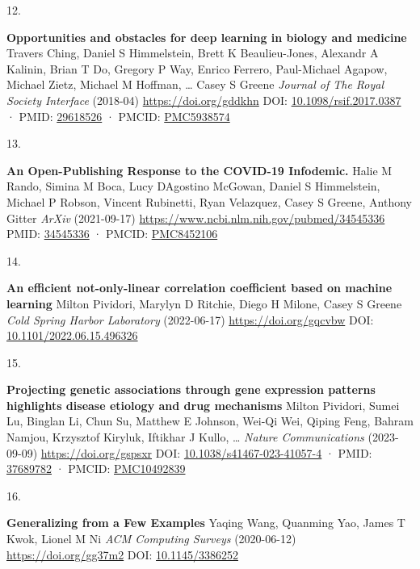 \documentclass[
]{article}
\newlength{\cslhangindent}
\newlength{\csllabelwidth}
\newlength{\cslentryspacingunit} %
\newenvironment{CSLReferences}[2] %
 {%
  \setlength{\parindent}{0pt}
  \ifodd #1
  \let\oldpar\par
  \def\par{\hangindent=\cslhangindent\oldpar}
  \fi
  \setlength{\parskip}{#2\cslentryspacingunit}
 }%
 {}
\newcommand{\CSLBlock}[1]{#1\hfill\break}
\newcommand{\CSLLeftMargin}[1]{\parbox[t]{\csllabelwidth}{#1}}
\newcommand{\CSLRightInline}[1]{\parbox[t]{\linewidth - \csllabelwidth}{#1}\break}
\begin{document}
\begin{CSLReferences}{0}{0}
\leavevmode{}%
\CSLLeftMargin{12. }%
\CSLRightInline{\textbf{Opportunities and obstacles for deep learning in biology and medicine}
\CSLBlock{Travers Ching, Daniel S Himmelstein, Brett K Beaulieu-Jones, Alexandr A Kalinin, Brian T Do, Gregory P Way, Enrico Ferrero, Paul-Michael Agapow, Michael Zietz, Michael M Hoffman, \ldots{} Casey S Greene} \emph{Journal of The Royal Society Interface} (2018-04) \url{https://doi.org/gddkhn}
\CSLBlock{DOI: \href{https://doi.org/10.1098/rsif.2017.0387}{10.1098/rsif.2017.0387} · PMID: \href{https://www.ncbi.nlm.nih.gov/pubmed/29618526}{29618526} · PMCID: \href{https://www.ncbi.nlm.nih.gov/pmc/articles/PMC5938574}{PMC5938574}}}

\leavevmode{}%
\CSLLeftMargin{13. }%
\CSLRightInline{\textbf{An Open-Publishing Response to the COVID-19 Infodemic.}
\CSLBlock{Halie M Rando, Simina M Boca, Lucy D\textquotesingle Agostino McGowan, Daniel S Himmelstein, Michael P Robson, Vincent Rubinetti, Ryan Velazquez, Casey S Greene, Anthony Gitter} \emph{ArXiv} (2021-09-17) \url{https://www.ncbi.nlm.nih.gov/pubmed/34545336}
\CSLBlock{PMID: \href{https://www.ncbi.nlm.nih.gov/pubmed/34545336}{34545336} · PMCID: \href{https://www.ncbi.nlm.nih.gov/pmc/articles/PMC8452106}{PMC8452106}}}

\leavevmode{}%
\CSLLeftMargin{14. }%
\CSLRightInline{\textbf{An efficient not-only-linear correlation coefficient based on machine learning}
\CSLBlock{Milton Pividori, Marylyn D Ritchie, Diego H Milone, Casey S Greene} \emph{Cold Spring Harbor Laboratory} (2022-06-17) \url{https://doi.org/gqcvbw}
\CSLBlock{DOI: \href{https://doi.org/10.1101/2022.06.15.496326}{10.1101/2022.06.15.496326}}}

\leavevmode{}%
\CSLLeftMargin{15. }%
\CSLRightInline{\textbf{Projecting genetic associations through gene expression patterns highlights disease etiology and drug mechanisms}
\CSLBlock{Milton Pividori, Sumei Lu, Binglan Li, Chun Su, Matthew E Johnson, Wei-Qi Wei, Qiping Feng, Bahram Namjou, Krzysztof Kiryluk, Iftikhar J Kullo, \ldots{} } \emph{Nature Communications} (2023-09-09) \url{https://doi.org/gspsxr}
\CSLBlock{DOI: \href{https://doi.org/10.1038/s41467-023-41057-4}{10.1038/s41467-023-41057-4} · PMID: \href{https://www.ncbi.nlm.nih.gov/pubmed/37689782}{37689782} · PMCID: \href{https://www.ncbi.nlm.nih.gov/pmc/articles/PMC10492839}{PMC10492839}}}

\leavevmode{}%
\CSLLeftMargin{16. }%
\CSLRightInline{\textbf{Generalizing from a Few Examples}
\CSLBlock{Yaqing Wang, Quanming Yao, James T Kwok, Lionel M Ni} \emph{ACM Computing Surveys} (2020-06-12) \url{https://doi.org/gg37m2}
\CSLBlock{DOI: \href{https://doi.org/10.1145/3386252}{10.1145/3386252}}}


\end{CSLReferences}
\end{document}
